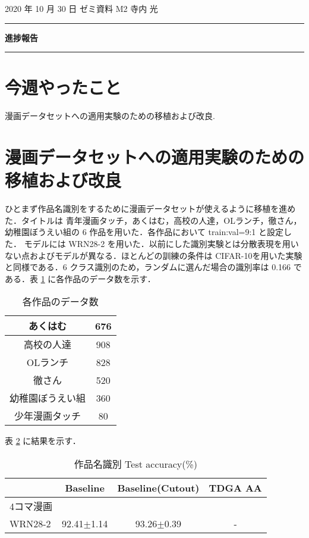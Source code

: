 \documentclass[onecolumn]{ujarticle}   %
\begin{document}
	\noindent

	\hspace{1em}
	2020 年 10 月 30 日
	ゼミ資料
	\hfill
	M2 寺内 光

	\vspace{2mm}

	\hrule

	\begin{center}
		{\Large \bf 進捗報告}
	\end{center}

	\hrule
	\vspace{3mm}

	\section{今週やったこと}
	漫画データセットへの適用実験のための移植および改良.

  \section{漫画データセットへの適用実験のための移植および改良}
  ひとまず作品名識別をするために漫画データセットが使えるように移植を進めた．タイトルは 青年漫画タッチ，あくはむ，高校の人達，OLランチ，徹さん，幼稚園ぼうえい組の 6 作品を用いた．各作品において train:val=9:1 と設定した．
  モデルには WRN28-2 を用いた．以前にした識別実験とは分散表現を用いない点およびモデルが異なる．ほとんどの訓練の条件は CIFAR-10を用いた実験と同様である．6 クラス識別のため，ランダムに選んだ場合の識別率は 0.166 である．表 \ref{tab:num_data} に各作品のデータ数を示す．

  \begin{table}[h]
  	\centering
  	\caption{各作品のデータ数}
  	\vspace{-4mm}
  	\label{tab:num_data}
  	\begin{tabular}{|c||c|} \hline
      あくはむ&676\\ \hline
  		高校の人達&908\\ \hline
  		OLランチ&828\\ \hline
  		徹さん&520\\ \hline
  		幼稚園ぼうえい組&360\\ \hline
      少年漫画タッチ&80\\ \hline
  	\end{tabular}
  \end{table}

  表 \ref{tab:title_experiments} に結果を示す．
  \begin{table}[ht]
		\centering
		\caption{作品名識別 Test accuracy(\%)}
		\label{tab:title_experiments}
		\begin{tabular}{l||c c c} \hline
		  &Baseline&Baseline(Cutout)&TDGA AA\\ \hline
			4コマ漫画 &&&\\
      WRN28-2&92.41$\pm$1.14 &93.26$\pm$0.39&-\\
		\end{tabular}
	\end{table}
\end{document}
